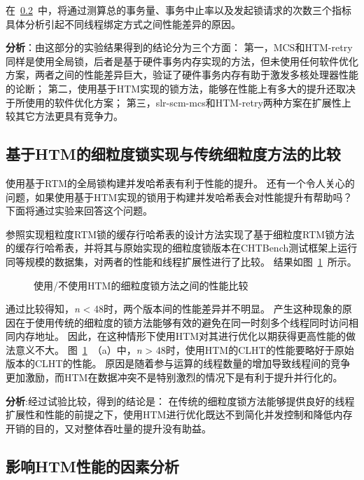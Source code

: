 在~\ref{sec:htm_analysis}~中，将通过测算总的事务量、事务中止率以及发起锁请求的次数三个指标具体分析引起不同线程绑定方式之间性能差异的原因。

\textbf{分析}：由这部分的实验结果得到的结论分为三个方面：
第一，MCS和HTM-retry同样是使用全局锁，后者是基于硬件事务内存实现的方法，但未使用任何软件优化方案，两者之间的性能差异巨大，验证了硬件事务内存有助于激发多核处理器性能的论断；
第二，使用基于HTM实现的锁方法，能够在性能上有多大的提升还取决于所使用的软件优化方案；
第三，slr-scm-mcs和HTM-retry两种方案在扩展性上较其它方法更具有竞争力。


\subsection{基于HTM的细粒度锁实现与传统细粒度方法的比较}
使用基于RTM的全局锁构建并发哈希表有利于性能的提升。
还有一个令人关心的问题，如果使用基于HTM实现的锁用于构建并发哈希表会对性能提升有帮助吗？
下面将通过实验来回答这个问题。

参照实现粗粒度RTM锁的缓存行哈希表的设计方法实现了基于细粒度RTM锁方法的缓存行哈希表，并将其与原始实现的细粒度锁版本在CHTBench测试框架上运行同等规模的数据集，对两者的性能和线程扩展性进行了比较。
结果如图~\ref{fig:htm_fine_grained}~所示。
\begin{figure}[htbp]
\centering
\caption{使用/不使用HTM的细粒度锁方法之间的性能比较}
\label{fig:htm_fine_grained}
\end{figure}
通过比较得知，\textit{n} < 48时，两个版本间的性能差异并不明显。
产生这种现象的原因在于使用传统的细粒度的锁方法能够有效的避免在同一时刻多个线程同时访问相同内存地址。
因此，在这种情形下使用HTM对其进行优化以期获得更高性能的做法意义不大。
图~\ref{fig:htm_fine_grained}~（a）中，\textit{n} > 48时，使用HTM的CLHT的性能要略好于原始版本的CLHT的性能。
原因是随着参与运算的线程数量的增加导致线程间的竞争更加激励，而HTM在数据冲突不是特别激烈的情况下是有利于提升并行化的。

\textbf{分析}:经过试验比较，得到的结论是：
在传统的细粒度锁方法能够提供良好的线程扩展性和性能的前提之下，使用HTM进行优化既达不到简化并发控制和降低内存开销的目的，又对整体吞吐量的提升没有助益。

\subsection{影响HTM性能的因素分析}
\label{sec:htm_analysis}

